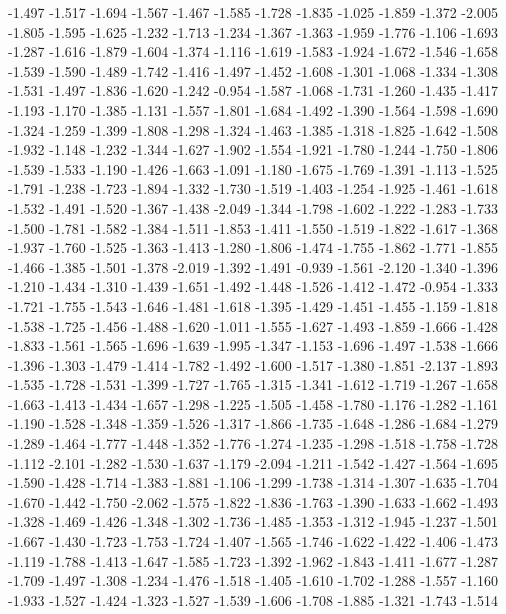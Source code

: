 \documentclass[9pt]{article}
\theoremstyle{plain}
\theoremstyle{definition}
\theoremstyle{remark}
\numberwithin{equation}{section}
\begin{document}
-1.497
-1.517
-1.694
-1.567
-1.467
-1.585
-1.728
-1.835
-1.025
-1.859
-1.372
-2.005
-1.805
-1.595
-1.625
-1.232
-1.713
-1.234
-1.367
-1.363
-1.959
-1.776
-1.106
-1.693
-1.287
-1.616
-1.879
-1.604
-1.374
-1.116
-1.619
-1.583
-1.924
-1.672
-1.546
-1.658
-1.539
-1.590
-1.489
-1.742
-1.416
-1.497
-1.452
-1.608
-1.301
-1.068
-1.334
-1.308
-1.531
-1.497
-1.836
-1.620
-1.242
-0.954
-1.587
-1.068
-1.731
-1.260
-1.435
-1.417
-1.193
-1.170
-1.385
-1.131
-1.557
-1.801
-1.684
-1.492
-1.390
-1.564
-1.598
-1.690
-1.324
-1.259
-1.399
-1.808
-1.298
-1.324
-1.463
-1.385
-1.318
-1.825
-1.642
-1.508
-1.932
-1.148
-1.232
-1.344
-1.627
-1.902
-1.554
-1.921
-1.780
-1.244
-1.750
-1.806
-1.539
-1.533
-1.190
-1.426
-1.663
-1.091
-1.180
-1.675
-1.769
-1.391
-1.113
-1.525
-1.791
-1.238
-1.723
-1.894
-1.332
-1.730
-1.519
-1.403
-1.254
-1.925
-1.461
-1.618
-1.532
-1.491
-1.520
-1.367
-1.438
-2.049
-1.344
-1.798
-1.602
-1.222
-1.283
-1.733
-1.500
-1.781
-1.582
-1.384
-1.511
-1.853
-1.411
-1.550
-1.519
-1.822
-1.617
-1.368
-1.937
-1.760
-1.525
-1.363
-1.413
-1.280
-1.806
-1.474
-1.755
-1.862
-1.771
-1.855
-1.466
-1.385
-1.501
-1.378
-2.019
-1.392
-1.491
-0.939
-1.561
-2.120
-1.340
-1.396
-1.210
-1.434
-1.310
-1.439
-1.651
-1.492
-1.448
-1.526
-1.412
-1.472
-0.954
-1.333
-1.721
-1.755
-1.543
-1.646
-1.481
-1.618
-1.395
-1.429
-1.451
-1.455
-1.159
-1.818
-1.538
-1.725
-1.456
-1.488
-1.620
-1.011
-1.555
-1.627
-1.493
-1.859
-1.666
-1.428
-1.833
-1.561
-1.565
-1.696
-1.639
-1.995
-1.347
-1.153
-1.696
-1.497
-1.538
-1.666
-1.396
-1.303
-1.479
-1.414
-1.782
-1.492
-1.600
-1.517
-1.380
-1.851
-2.137
-1.893
-1.535
-1.728
-1.531
-1.399
-1.727
-1.765
-1.315
-1.341
-1.612
-1.719
-1.267
-1.658
-1.663
-1.413
-1.434
-1.657
-1.298
-1.225
-1.505
-1.458
-1.780
-1.176
-1.282
-1.161
-1.190
-1.528
-1.348
-1.359
-1.526
-1.317
-1.866
-1.735
-1.648
-1.286
-1.684
-1.279
-1.289
-1.464
-1.777
-1.448
-1.352
-1.776
-1.274
-1.235
-1.298
-1.518
-1.758
-1.728
-1.112
-2.101
-1.282
-1.530
-1.637
-1.179
-2.094
-1.211
-1.542
-1.427
-1.564
-1.695
-1.590
-1.428
-1.714
-1.383
-1.881
-1.106
-1.299
-1.738
-1.314
-1.307
-1.635
-1.704
-1.670
-1.442
-1.750
-2.062
-1.575
-1.822
-1.836
-1.763
-1.390
-1.633
-1.662
-1.493
-1.328
-1.469
-1.426
-1.348
-1.302
-1.736
-1.485
-1.353
-1.312
-1.945
-1.237
-1.501
-1.667
-1.430
-1.723
-1.753
-1.724
-1.407
-1.565
-1.746
-1.622
-1.422
-1.406
-1.473
-1.119
-1.788
-1.413
-1.647
-1.585
-1.723
-1.392
-1.962
-1.843
-1.411
-1.677
-1.287
-1.709
-1.497
-1.308
-1.234
-1.476
-1.518
-1.405
-1.610
-1.702
-1.288
-1.557
-1.160
-1.933
-1.527
-1.424
-1.323
-1.527
-1.539
-1.606
-1.708
-1.885
-1.321
-1.743
-1.514
\end{document}
